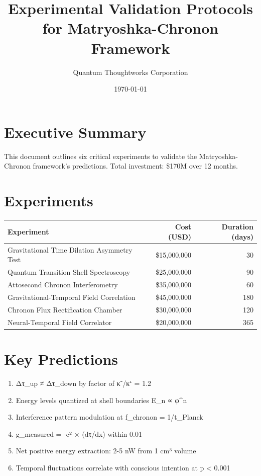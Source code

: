 \documentclass{article}
\title{Experimental Validation Protocols for Matryoshka-Chronon Framework}
\author{Quantum Thoughtworks Corporation}
\date{\today}
\begin{document}
\maketitle

\section{Executive Summary}
This document outlines six critical experiments to validate the Matryoshka-Chronon framework's predictions. Total investment: \$170M over 12 months.

\section{Experiments}
\begin{table}[h]
\centering
\begin{tabular}{lrr}
\toprule
Experiment & Cost (USD) & Duration (days) \\
\midrule
Gravitational Time Dilation Asymmetry Test & \$15,000,000 & 30 \\
Quantum Transition Shell Spectroscopy & \$25,000,000 & 90 \\
Attosecond Chronon Interferometry & \$35,000,000 & 60 \\
Gravitational-Temporal Field Correlation & \$45,000,000 & 180 \\
Chronon Flux Rectification Chamber & \$30,000,000 & 120 \\
Neural-Temporal Field Correlator & \$20,000,000 & 365 \\

\bottomrule
\end{tabular}
\end{table}

\section{Key Predictions}
\begin{enumerate}
\item Δτ_up ≠ Δτ_down by factor of κ⁻/κ⁺ = 1.2
\item Energy levels quantized at shell boundaries E_n ∝ φ^n
\item Interference pattern modulation at f_chronon = 1/t_Planck
\item g_measured = -c² × (dτ/dx) within 0.01%
\item Net positive energy extraction: 2-5 nW from 1 cm³ volume
\item Temporal fluctuations correlate with conscious intention at p < 0.001

\end{enumerate}
\end{document}
